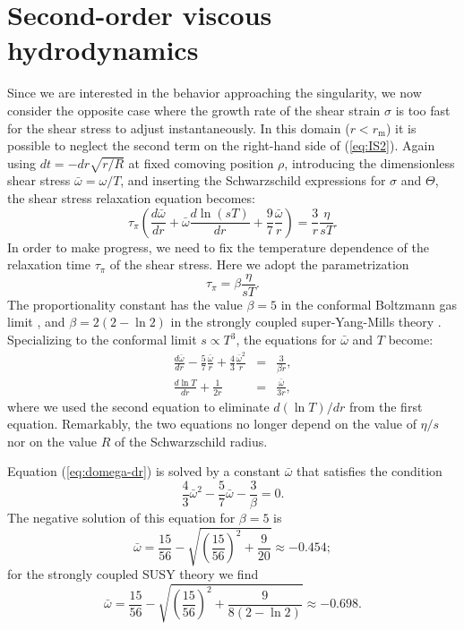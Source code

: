 \documentclass[article,twocolumn]{revtex4}
\newcommand{\be}{\begin{equation}}
\newcommand{\ee}{\end{equation}}
\newcommand{\ba}{\begin{eqnarray}}
\newcommand{\ea}{\end{eqnarray}}
\begin{document}
\section{Second-order viscous hydrodynamics}

Since we are interested in the behavior approaching the singularity, we now consider the opposite case where the growth rate of the shear strain $\sigma$ is too fast for the shear stress to adjust instantaneously. In this domain ($r < r_\mathrm{m}$) it is possible to neglect the second term on the right-hand side of (\ref{eq:IS2}). Again using $dt = - dr \sqrt{r/R}$ at fixed comoving position $\rho$, introducing the dimensionless shear stress $\bar\omega = \omega/T$, and inserting the Schwarzschild expressions for $\sigma$ and $\Theta$, the shear stress relaxation equation becomes:
\be
\tau_{\pi} \left( \frac{d\bar\omega}{dr} + \bar\omega\frac{d\ln(sT)}{dr} + \frac{9}{7} \frac{\bar\omega}{r} \right) 
= \frac{3}{r} \frac{\eta}{sT}  .
\label{eq:omega-relax}
\ee
In order to make progress, we need to fix the temperature dependence of the relaxation time $\tau_{\pi}$ of the shear stress. Here we adopt the parametrization
\be
\tau_{\pi} = \beta \frac{\eta}{s T} .
\ee
The proportionality constant has the value $\beta = 5$ in the conformal Boltzmann gas limit \cite{Denicol:2012cn}, and $\beta = 2(2-\ln 2)$ in the strongly coupled super-Yang-Mills theory \cite{Baier:2007ix,Natsuume:2007ty}. Specializing to the conformal limit $s \propto T^3$, the equations for $\bar\omega$ and $T$ become: 
\ba
\frac{d\bar\omega}{dr} - \frac{5}{7} \frac{\bar\omega}{r} + \frac{4}{3} \frac{\bar\omega^2}{r} &=& \frac{3}{\beta r} ,
\label{eq:domega-dr}
\\
\frac{d \ln T}{dr} + \frac{1}{2r} &=& \frac{\bar\omega}{3r} ,
\label{eq:dT-dr}
\ea
where we used the second equation to eliminate $d(\ln T)/dr$ from the first equation. Remarkably, the two equations no longer depend on the value of $\eta/s$ nor on the value $R$ of the Schwarzschild radius. 

Equation (\ref{eq:domega-dr}) is solved by a constant $\bar\omega$ that satisfies the condition 
\be
\frac{4}{3} \bar\omega^2 - \frac{5}{7} \bar\omega - \frac{3}{\beta} = 0 .
\ee 
The negative solution of this equation for $\beta = 5$ is
\be
\bar\omega = \frac{15}{56} - \sqrt{\left(\frac{15}{56}\right)^2+\frac{9}{20}} \approx -0.454 ;
\ee
for the strongly coupled SUSY theory we find
\be
\bar\omega = \frac{15}{56} - \sqrt{\left(\frac{15}{56}\right)^2+\frac{9}{8(2-\ln 2)}} \approx -0.698 .
\ee
\end{document}
